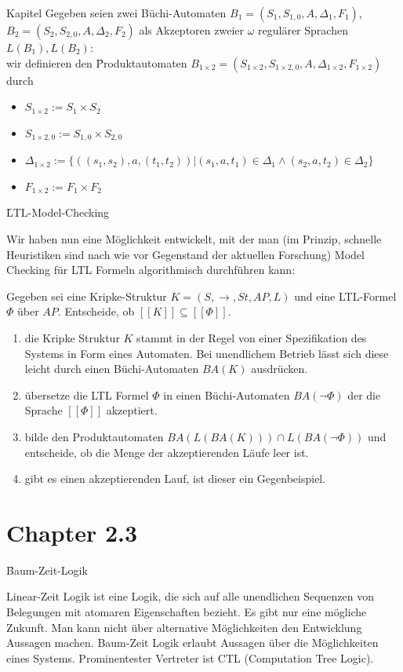 \begin{chapter}{Kapitel}
\noindent Gegeben seien zwei Büchi-Automaten $B_1=(S_1,S_{1,0},A,\Delta_1,F_1)$, $B_2=(S_2,S_{2,0},A,\Delta_2,F_2)$ als Akzeptoren zweier $\omega$ regulärer
Sprachen $L(B_1),L(B_2)$:  \\ wir definieren den \f{Produktautomaten} $B_{1\times2} =(S_{1\times2},S_{1\times2,0},A,\Delta_{1\times2},F_{1\times2})$ durch 
\begin{itemize}
 \item $S_{1\times2} := S_1\times S_2$
 \item $S_{1\times2,0} := S_{1,0}\times S_{2,0}$
 \item $\Delta_{1\times2} := \{((s_1,s_2),a,(t_1,t_2))|(s_1,a,t_1)\in \Delta_1 \wedge (s_2,a,t_2)\in \Delta_2\}$
 \item $F_{1\times2} := F_1\times F_2$
\end{itemize}
\vspace*{6pt}
\f{LTL-Model-Checking}
\vspace*{5pt}

\noindent Wir haben nun eine Möglichkeit entwickelt, mit der man (im Prinzip, schnelle Heuristiken sind nach wie vor Gegenstand der aktuellen Forschung) Model 
Checking für LTL Formeln algorithmisch durchführen kann:

\noindent Gegeben sei eine Kripke-Struktur $K=(S,\rightarrow, St,AP,L)$ und eine LTL-Formel $\Phi$ über $AP$. Entscheide, ob $[[K]] \subseteq [[\Phi]]$.
\begin{enumerate}
 \item die Kripke Struktur $K$ stammt in der Regel von einer Spezifikation des Systems in Form eines Automaten. Bei unendlichem Betrieb lässt sich diese leicht 
 durch einen Büchi-Automaten $BA(K)$ ausdrücken. 
 \item übersetze die LTL Formel $\Phi$ in einen Büchi-Automaten $BA(\neg\Phi)$ der die Sprache $[[\Phi]]$ akzeptiert.
 \item bilde den Produktautomaten $BA(L(BA(K)))\cap L(BA(\neg\Phi))$ und entscheide, ob  die Menge der akzeptierenden Läufe leer ist. 
 \item gibt es einen akzeptierenden Lauf, ist dieser ein Gegenbeispiel.
\end{enumerate}

\section*{Chapter 2.3}
\f{Baum-Zeit-Logik}

\noindent Linear-Zeit Logik ist eine Logik, die sich auf alle unendlichen Sequenzen von Belegungen mit atomaren Eigenschaften bezieht. Es gibt nur eine 
mögliche Zukunft. Man kann nicht über alternative Möglichkeiten den Entwicklung Aussagen machen. Baum-Zeit Logik erlaubt Aussagen über die Möglichkeiten eines
Systems. Prominentester Vertreter ist CTL (Computation Tree Logic).
\vspace*{5pt}


\end{chapter}
